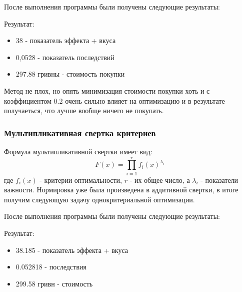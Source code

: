 \documentclass[14pt,a4paper,report]{report}
\begin{document}


После выполнения программы были получены следующие результаты:



Результат:
\begin{itemize}
\item 38 - показатель эффекта + вкуса
\item 0,0528 - показатель последствий
\item 297.88 гривны - стоимость покупки
\end{itemize}

Метод не плох, но опять минимизация стоимости покупки хоть и с коэффициентом 0.2 очень сильно влияет на оптимизацию и в результате получаеться, что лучше вообще ничего не покупать.

























\subsubsection{Мультипликативная свертка критериев}
Формула мультипликативной свертки имеет вид:
\begin{equation}
F(x) = \prod_{i=1}^{r}f_i(x)^{\lambda_i}
\end{equation}
где $f_i(x)$ - критерии оптимальности, $r$ - их общее число, а $\lambda_i$ - показатели важности. Нормировка уже была произведена в аддитивной свертки, в итоге получим следующую задачу однокритериальной оптимизации.






После выполнения программы были получены следующие результаты:



Результат:
\begin{itemize}
\item 38.185 - показатель эффекта + вкуса
\item 0.052818 - последствия
\item 299.58 гривн - стоимость 
\end{itemize}
\end{document}
